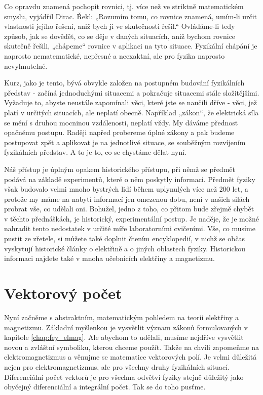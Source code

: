     Co opravdu znamená pochopit rovnici, tj. více než ve striktně matematickém smyslu, vyjádřil 
    Dirac. Řekl: „Rozumím tomu, co rovnice znamená, umím-li určit vlastnosti jejího řešení, aniž 
    bych ji ve skutečnosti řešil.“ Ovládáme-li tedy způsob, jak se dovědět, co se děje v daných 
    situacích, aniž bychom rovnice skutečně řešili, „chápeme“ rovnice v aplikaci na tyto situace. 
    Fyzikální chápání je naprosto nematematické, nepřesné a neexaktní, ale pro fyzika naprosto 
    nevyhnutelné.
    
    Kurz, jako je tento, bývá obvykle založen na postupném budování fyzikálních představ - začíná 
    jednoduchými situacemi a pokračuje situacemi stále složitějšími. Vyžaduje to, abyste neustále 
    zapomínali věci, které jste se naučili dříve - věci, jež platí v určitých situacích, ale neplatí 
    obecně. Například „zákon“, že elektrická síla se mění s druhou mocninou vzdálenosti, neplatí 
    vždy. My dáváme přednost opačnému postupu. Raději napřed probereme úplné zákony a pak budeme 
    postupovat zpět a aplikovat je na jednotlivé situace, se souběžným rozvíjením fyzikálních 
    představ. A to je to, co se chystáme dělat nyní.
    
    Náš přístup je úplným opakem historického přístupu, při němž se předmět podává na základě 
    experimentů, které o něm poskytly informaci. Předmět fyziky však budovalo velmi mnoho bystrých 
    lidí během uplynulých více než 200 let, a protože my máme na nabytí informací jen omezenou dobu, 
    není v našich silách probrat vše, co udělali oni. Bohužel, jedno z toho, co přitom bude zřejmě 
    chybět v těchto přednáškách, je historický, experimentální postup. Je naděje, že je možné 
    nahradit tento nedostatek v určité míře laboratorními cvičeními. Vše, co musíme pustit ze 
    zřetele, si můžete také doplnit čtením encyklopedií, v nichž se občas vyskytují historické 
    články o elektřině a o jiných oblastech fyziky. Historickou informaci najdete také v mnoha 
    učebnicích elektřiny a magnetizmu.
    
  \section{Vektorový počet}
    \cite[s.~28]{Feynman02}  Nyní začněme s abstraktním, matematickým pohledem na teorii elektřiny a
    magnetizmu. Základní myšlenkou je vysvětlit význam zákonů formulovaných v kapitole 
    \ref{chap:fey_elmag}. Ale abychom to udělali, musíme nejdříve vysvětlit novou a zvláštní 
    symboliku, kterou chceme použít. Takže na chvíli zapomeňme na elektromagnetizmus a věnujme se 
    matematice vektorových polí. Je velmi důležitá nejen pro elektromagnetizmus, ale pro všechny 
    druhy fyzikálních situací. Diferenciální počet vektorů je pro všechna odvětví fyziky stejně 
    důležitý jako obyčejný diferenciální a integrální počet. Tak se do toho pusťme.

